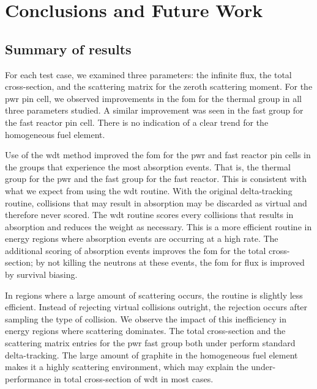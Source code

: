 
\chapter{Conclusions and Future Work}
\label{chap:conclusion}


\section{Summary of results}
\label{sec:results_summary}

For each test case, we examined three parameters: the infinite flux,
the total cross-section, and the scattering matrix for the zeroth
scattering moment. For the \gls{pwr} pin cell, we observed
improvements in the \gls{fom} for the thermal group in all three
parameters studied. A similar improvement was seen in the fast group
for the fast reactor pin cell. There is no indication of a clear trend
for the homogeneous fuel element.

Use of the \gls{wdt} method improved the \gls{fom} for the \gls{pwr}
and fast reactor pin cells in the groups that experience the most
absorption events. That is, the thermal group for the \gls{pwr} and
the fast group for the fast reactor. This is consistent with what we
expect from using the \gls{wdt} routine. With the original
delta-tracking routine, collisions that may result in absorption may
be discarded as virtual and therefore never scored. The \gls{wdt}
routine scores every collisions that results in absorption and reduces
the weight as necessary. This is a more efficient routine in energy
regions where absorption events are occurring at a high rate. The
additional scoring of absorption events improves the \gls{fom} for the
total cross-section; by not killing the neutrons at these events, the
\gls{fom} for flux is improved by survival biasing. 

In regions where a large amount of scattering occurs, the routine is
slightly less efficient. Instead of rejecting virtual collisions
outright, the rejection occurs after sampling the type of
collision. We observe the impact of this inefficiency in energy
regions where scattering dominates. The total cross-section and the
scattering matrix entries for the \gls{pwr} fast group both under
perform standard delta-tracking. The large amount of graphite in the
homogeneous fuel element makes it a highly scattering environment,
which may explain the under-performance in total cross-section of
\gls{wdt} in most cases.

